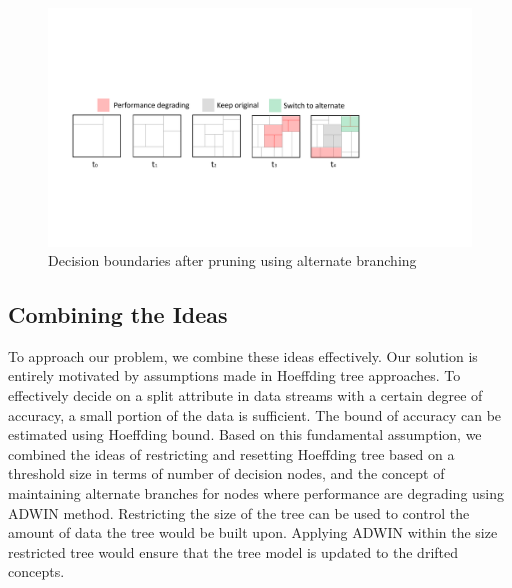 \begin{figure}[htbp]
    \begin{center}
        \includegraphics[width=14.0cm]{figs/prunedb.pdf}
        \caption{Decision boundaries after pruning using alternate branching}
        \label{fig:algo:prunedb}
    \end{center}
\end{figure}

\subsection{Combining the Ideas}
To approach our problem, we combine these ideas effectively. Our solution is entirely motivated by assumptions made in Hoeffding tree approaches. To effectively decide on a split attribute in data streams with a certain degree of accuracy, a small portion of the data is  sufficient. The bound of accuracy can be estimated using Hoeffding bound. Based on this fundamental assumption, we combined the ideas of restricting and resetting Hoeffding tree based on a threshold size in terms of number of decision nodes, and the concept of maintaining alternate branches for nodes where performance are degrading using ADWIN method. Restricting the size of the tree can be used to control the amount of data the tree would be built upon. Applying ADWIN within the size restricted tree would ensure that the tree model is updated to the drifted concepts. 

